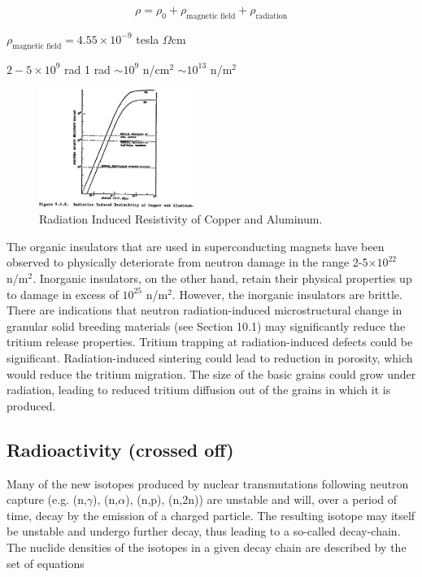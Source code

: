 \documentclass[11pt]{report} %
\begin{document}
\begin{equation}
  \rho = \rho_0 + \rho_{\text{magnetic field}} + \rho_{\text{radiation}}
\end{equation}

$\rho_{\text{magnetic field}} = 4.55 \times 10^{-9}$ tesla $\Omega$cm

$2-5 \times 10^9$ rad
1 rad $\sim 10^9$ n/cm$^2$ $\sim 10^13$ n/m$^2$

\begin{figure}[H]
  \centering
  \includegraphics[width=0.45\textwidth]{figs/resistivity.png}
  \caption{Radiation Induced Resistivity of Copper and Aluminum.}
  \label{fig:resistivity}
\end{figure}

The organic insulators that are used in superconducting magnets have been observed to physically deteriorate from neutron damage in the range 2-5$\times 10^{22}$ n/m$^2$. Inorganic insulators, on the other hand, retain their physical properties up to damage in excess of $10^{25}$ n/m$^2$. However, the inorganic insulators are brittle. There are indications that neutron radiation-induced microstructural change in granular solid breeding materials (see Section 10.1) may significantly reduce the tritium release properties. Tritium trapping at radiation-induced defects could be significant. Radiation-induced sintering could lead to reduction in porosity, which would reduce the tritium migration. The size of the basic grains could grow under radiation, leading to reduced tritium diffusion out of the grains in which it is produced.

\subsection{Radioactivity (crossed off)}
Many of the new isotopes produced by nuclear transmutations following neutron capture (e.g. (n,$\gamma$), (n,$\alpha$), (n,p), (n,2n)) are unstable and will, over a period of time, decay by the emission of a charged particle. The resulting isotope may itself be unstable and undergo further decay, thus leading to a so-called decay-chain. The nuclide densities of the isotopes in a given decay chain are described by the set of equations
\end{document}
